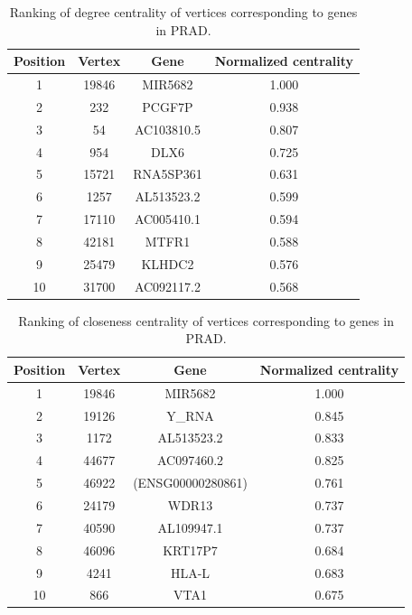 \documentclass[12pt,a4paper]{report}
\begin{document}
\begin{table}[H]
\centering
\caption{Ranking of degree centrality of vertices corresponding to genes in PRAD.}
\label{tab:prad1}
\begin{tabular}{cccc}
\hline
\textbf{Position}         & \textbf{Vertex}     & \textbf{Gene}   & \textbf{Normalized centrality}   \\
\hline
   1       &     19846      &    MIR5682       &  1.000          \\
   2      &     232      &    PCGF7P       &     0.938       \\
   3       &     54      &    AC103810.5       &      0.807     \\
   4       &       954    &   DLX6        &       0.725    \\
   5       &       15721    &     RNA5SP361      &       0.631     \\
   6       &     1257      &   AL513523.2     &       0.599 \\
   7       &     17110      &   AC005410.1     &      0.594      \\
   8       &      42181     &   MTFR1        &      0.588      \\
   9       &      25479     &     KLHDC2      &       0.576 \\
   10       &     31700      &     AC092117.2      &       0.568     \\
\hline
\end{tabular}
\end{table}

\begin{table}[H]
\centering
\caption{Ranking of closeness centrality of vertices corresponding to genes in PRAD.}
\label{tab:prad2}
\begin{tabular}{cccc}
\hline
\textbf{Position}         & \textbf{Vertex}     & \textbf{Gene}   & \textbf{Normalized centrality}   \\
\hline
   1       &     19846      &    MIR5682       &   1.000         \\
   2      &      19126     &     Y\_RNA      &       0.845     \\
   3       &      1172     &      AL513523.2     &         0.833   \\
   4       &      44677     &   AC097460.2        &  0.825          \\
   5       &      46922     &    (ENSG00000280861)       &         0.761   \\
   6       &     24179      &     WDR13      &  0.737          \\
   7       &     40590      &      AL109947.1     &     0.737       \\
   8       &     46096      &    KRT17P7       &  0.684          \\
   9       &      4241     &      HLA-L     &       0.683     \\
   10       &       866    &       VTA1    &       0.675     \\
\hline
\end{tabular}
\end{table}
\end{document}
